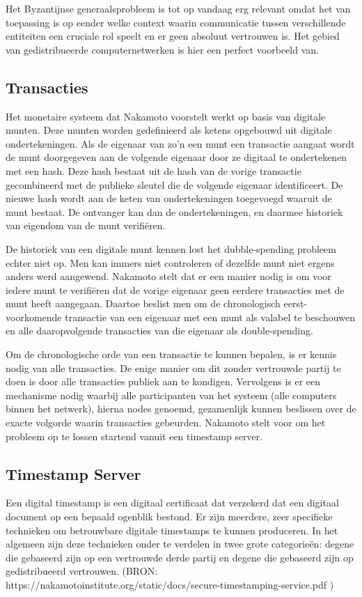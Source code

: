 			Het Byzantijnse generaalsprobleem is tot op vandaag erg relevant omdat het van toepassing is op eender welke context waarin communicatie tussen verschillende entiteiten een cruciale rol speelt en er geen absoluut vertrouwen is. Het gebied van gedistribueerde computernetwerken is hier een perfect voorbeeld van. 
			
	\subsection{Transacties}
	Het monetaire systeem dat Nakamoto voorstelt werkt op basis van digitale munten. Deze munten worden gedefinieerd als ketens opgebouwd uit digitale ondertekeningen. Als de eigenaar van zo’n een munt een transactie aangaat wordt de munt doorgegeven aan de volgende eigenaar door ze digitaal te ondertekenen met een hash. Deze hash bestaat uit de hash van de vorige transactie gecombineerd met de publieke sleutel die de volgende eigenaar identificeert. De nieuwe hash wordt aan de keten van ondertekeningen toegevoegd waaruit de munt bestaat. De ontvanger kan dan de ondertekeningen, en daarmee historiek van eigendom van de munt verifiëren. 
			
	De historiek van een digitale munt kennen lost het dubble-spending probleem echter niet op. Men kan immers niet controleren of dezelfde munt niet ergens anders werd aangewend. Nakamoto stelt dat er een manier nodig is om voor iedere munt te verifiëren dat de vorige eigenaar geen eerdere transacties met de munt heeft aangegaan. Daartoe beslist men om de chronologisch eerst-voorkomende transactie van een eigenaar met een munt als valabel te beschouwen en alle daaropvolgende transacties van die eigenaar als double-spending. 
			
	Om de chronologische orde van een transactie te kunnen bepalen, is er kennis nodig van alle transacties. De enige manier om dit zonder vertrouwde partij te doen is door alle transacties publiek aan te kondigen. Vervolgens is er een mechanisme nodig waarbij alle participanten van het systeem (alle computers binnen het netwerk), hierna nodes genoemd, gezamenlijk kunnen beslissen over de exacte volgorde waarin transacties gebeurden. Nakamoto stelt voor om het probleem op te lossen startend vanuit een timestamp server. 
			
	\subsection{Timestamp Server}
	Een digital timestamp is een digitaal certificaat dat verzekerd dat een digitaal document op een bepaald ogenblik bestond. Er zijn meerdere, zeer specifieke technieken om betrouwbare digitale timestamps te kunnen produceren. In het algemeen zijn deze technieken onder te verdelen in twee grote categorieën: degene die gebaseerd zijn op een vertrouwde derde partij en degene die gebaseerd zijn op gedistribueerd vertrouwen. (BRON: https://nakamotoinstitute.org/static/docs/secure-timestamping-service.pdf )
	

